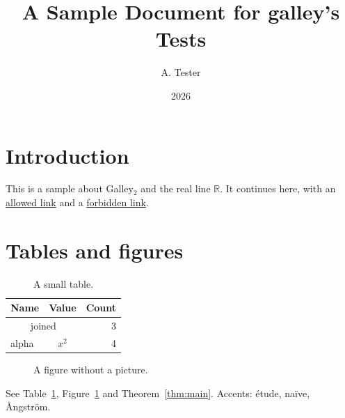 \documentclass{article}
\title{A Sample Document for galley's Tests}
\author{A. Tester}
\date{2026}
\newcommand{\gal}{Galley$_2$}
\newcommand{\R}{\mathbb{R}}
\begin{document}
\maketitle

\section{Introduction}
\label{sec:intro}
This is a sample about \gal{} and the real line $\R$.
It continues here, with an \href{https://example.org}{allowed link} and a
\href{javascript:alert(1)}{forbidden link}.



\section{Tables and figures}
\begin{table}[h]
\centering
\begin{tabular}{l|cr}
\toprule
Name & Value & Count \\
\midrule
\multicolumn{2}{c}{joined} & 3 \\
alpha & $x^2$ & 4 \\
\bottomrule
\end{tabular}
\caption{A small table.}
\label{tab:small}
\end{table}

\begin{figure}[h]
\caption{A figure without a picture.}
\label{fig:empty}
\end{figure}

See Table~\ref{tab:small}, Figure~\ref{fig:empty} and Theorem~\ref{thm:main}.
Accents: \'etude, na\"ive, \AA ngstr\"om.



\end{document}
